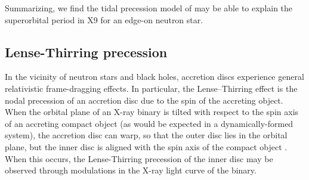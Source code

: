\documentclass[a4paper,fleqn,usenatbib]{mnras}
\begin{document}
Summarizing, we find the tidal precession model of \citet{1998MNRAS.299L..32L} may be able to explain the superorbital period in X9 for an edge-on neutron star.

\subsection{Lense-Thirring precession}

In the vicinity of neutron stars and black holes, accretion discs experience general relativistic frame-dragging effects. In particular, the Lense--Thirring effect \citep{LT18} is the nodal precession of an accretion disc due to the spin of the accreting object. When the orbital plane of an X-ray binary is tilted with respect to the spin axis of an accreting compact object (as would be expected in a dynamically-formed system), the accretion disc can warp, so that the outer disc lies in the orbital plane, but the inner disc is aligned with the spin axis of the compact object \citep{1975ApJ...195L..65B}. When this occurs, the Lense-Thirring precession of the inner disc may be observed through modulations in the X-ray light curve of the binary.
\end{document}
